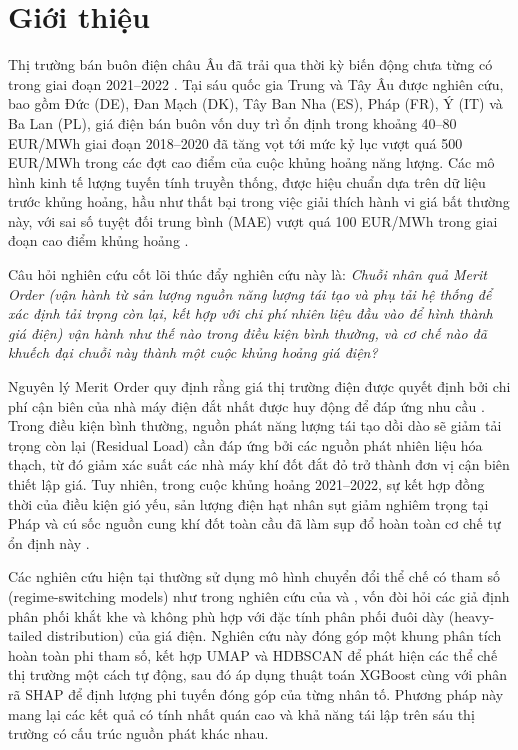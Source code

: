 
\section{Giới thiệu}

Thị trường bán buôn điện châu Âu đã trải qua thời kỳ biến động chưa từng có trong giai đoạn 2021--2022 \citep{iea2022}. Tại sáu quốc gia Trung và Tây Âu được nghiên cứu, bao gồm Đức (DE), Đan Mạch (DK), Tây Ban Nha (ES), Pháp (FR), Ý (IT) và Ba Lan (PL), giá điện bán buôn vốn duy trì ổn định trong khoảng 40--80 EUR/MWh giai đoạn 2018--2020 đã tăng vọt tới mức kỷ lục vượt quá 500 EUR/MWh trong các đợt cao điểm của cuộc khủng hoảng năng lượng. Các mô hình kinh tế lượng tuyến tính truyền thống, được hiệu chuẩn dựa trên dữ liệu trước khủng hoảng, hầu như thất bại trong việc giải thích hành vi giá bất thường này, với sai số tuyệt đối trung bình (MAE) vượt quá 100 EUR/MWh trong giai đoạn cao điểm khủng hoảng \citep{lago2021}.

Câu hỏi nghiên cứu cốt lõi thúc đẩy nghiên cứu này là: \textit{Chuỗi nhân quả Merit Order (vận hành từ sản lượng nguồn năng lượng tái tạo và phụ tải hệ thống để xác định tải trọng còn lại, kết hợp với chi phí nhiên liệu đầu vào để hình thành giá điện) vận hành như thế nào trong điều kiện bình thường, và cơ chế nào đã khuếch đại chuỗi này thành một cuộc khủng hoảng giá điện?}

Nguyên lý Merit Order quy định rằng giá thị trường điện được quyết định bởi chi phí cận biên của nhà máy điện đắt nhất được huy động để đáp ứng nhu cầu \citep{sensfuss2008}. Trong điều kiện bình thường, nguồn phát năng lượng tái tạo dồi dào sẽ giảm tải trọng còn lại (Residual Load) cần đáp ứng bởi các nguồn phát nhiên liệu hóa thạch, từ đó giảm xác suất các nhà máy khí đốt đắt đỏ trở thành đơn vị cận biên thiết lập giá. Tuy nhiên, trong cuộc khủng hoảng 2021--2022, sự kết hợp đồng thời của điều kiện gió yếu, sản lượng điện hạt nhân sụt giảm nghiêm trọng tại Pháp và cú sốc nguồn cung khí đốt toàn cầu đã làm sụp đổ hoàn toàn cơ chế tự ổn định này \citep{iea2022}.

Các nghiên cứu hiện tại thường sử dụng mô hình chuyển đổi thể chế có tham số (regime-switching models) như trong nghiên cứu của \citet{janczura2010} và \citet{huisman2003}, vốn đòi hỏi các giả định phân phối khắt khe và không phù hợp với đặc tính phân phối đuôi dày (heavy-tailed distribution) của giá điện. Nghiên cứu này đóng góp một khung phân tích hoàn toàn phi tham số, kết hợp UMAP \citep{mcinnes2018} và HDBSCAN \citep{campello2013} để phát hiện các thể chế thị trường một cách tự động, sau đó áp dụng thuật toán XGBoost \citep{chen2016} cùng với phân rã SHAP \citep{lundberg2017} để định lượng phi tuyến đóng góp của từng nhân tố. Phương pháp này mang lại các kết quả có tính nhất quán cao và khả năng tái lập trên sáu thị trường có cấu trúc nguồn phát khác nhau.

